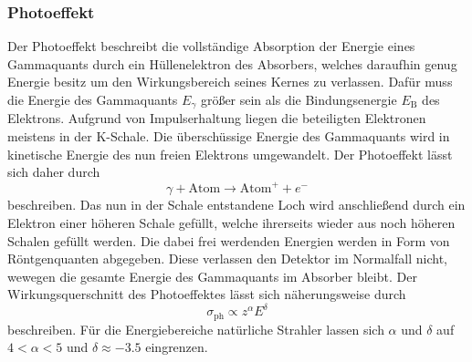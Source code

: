 \subsubsection{Photoeffekt}
Der Photoeffekt beschreibt die vollständige Absorption der Energie eines Gammaquants durch ein Hüllenelektron des Absorbers, welches daraufhin genug Energie besitz um den Wirkungsbereich seines Kernes zu verlassen. Dafür muss die Energie des Gammaquants $E_\gamma$ größer sein als die Bindungsenergie $E_\text{B}$ des Elektrons. Aufgrund von Impulserhaltung liegen die beteiligten Elektronen meistens in der K-Schale. Die überschüssige Energie des Gammaquants wird in kinetische Energie des nun freien Elektrons umgewandelt. Der Photoeffekt lässt sich daher durch 
\begin{equation}
    \gamma + \text{Atom} \to \text{Atom}^+ + e^-
\end{equation}
beschreiben. Das nun in der Schale entstandene Loch wird anschließend durch ein Elektron einer höheren Schale gefüllt, welche ihrerseits wieder aus noch höheren Schalen gefüllt werden.
Die dabei frei werdenden Energien werden in Form von Röntgenquanten abgegeben. Diese verlassen den Detektor im Normalfall nicht, wewegen die gesamte Energie des Gammaquants im Absorber bleibt.
Der Wirkungsquerschnitt des Photoeffektes lässt sich näherungsweise durch
\begin{equation}
    \sigma_\text{ph} \propto z^\alpha E^\delta
\end{equation}
beschreiben. Für die Energiebereiche natürliche Strahler lassen sich $\alpha$ und $\delta$ auf $4 < \alpha <5 $ und $\delta \approx -3.5$ eingrenzen. 

